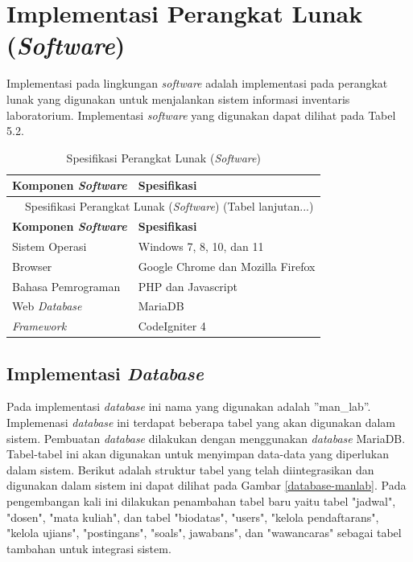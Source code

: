\section{Implementasi Perangkat Lunak (\textit{Software})}
Implementasi pada lingkungan \textit{software} adalah implementasi pada perangkat lunak yang digunakan untuk menjalankan sistem informasi inventaris laboratorium. Implementasi \textit{software} yang digunakan dapat dilihat pada Tabel 5.2.

\begin{longtable}{l l}
	\caption{Spesifikasi Perangkat Lunak (\textit{Software})}                                                               \\
	\hline
	\textbf{Komponen \textit{Software}} & \textbf{Spesifikasi}                                                              \\
	\hline
	\endfirsthead

	\multicolumn{2}{c}{\tablename\ \thetable\ {Spesifikasi Perangkat Lunak (\textit{Software})} \space (Tabel lanjutan...)} \\
	\hline
	\textbf{Komponen \textit{Software}} & \textbf{Spesifikasi}                                                              \\
	\hline
	\endhead

	Sistem Operasi                      & Windows 7, 8, 10, dan 11                                                          \\
	Browser                             & Google Chrome dan Mozilla Firefox                                                 \\
	Bahasa Pemrograman                  & PHP dan Javascript                                                                \\
	Web \textit{Database}               & MariaDB                                                                           \\
	\textit{Framework}                  & CodeIgniter 4                                                                     \\
	\hline
\end{longtable}

\subsection{Implementasi \textit{Database}}
Pada implementasi \textit{database} ini nama yang digunakan adalah ”man\_lab”. Implemenasi \textit{database} ini terdapat beberapa tabel yang akan digunakan dalam sistem. Pembuatan \textit{database} dilakukan dengan menggunakan \textit{database} MariaDB. Tabel-tabel ini akan digunakan untuk menyimpan data-data yang diperlukan dalam sistem. Berikut adalah struktur tabel yang telah diintegrasikan dan digunakan dalam sistem ini dapat dilihat pada Gambar \ref{database-manlab}. Pada pengembangan kali ini dilakukan penambahan tabel baru yaitu tabel "jadwal", "dosen", "mata kuliah", dan tabel  "biodatas", "users", "kelola pendaftarans", "kelola ujians", "postingans", "soals", jawabans", dan "wawancaras" sebagai tabel tambahan untuk integrasi sistem.

